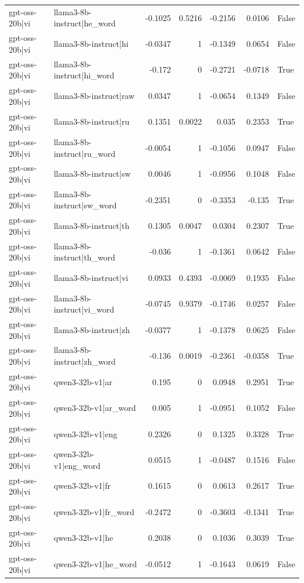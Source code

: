 \begin{table}
\begin{tabular}{l l r r r r l}
gpt-oss-20b|vi & llama3-8b-instruct|he_word & -0.1025 & 0.5216 & -0.2156 & 0.0106 & False \\
gpt-oss-20b|vi & llama3-8b-instruct|hi & -0.0347 & 1 & -0.1349 & 0.0654 & False \\
gpt-oss-20b|vi & llama3-8b-instruct|hi_word & -0.172 & 0 & -0.2721 & -0.0718 & True \\
gpt-oss-20b|vi & llama3-8b-instruct|raw & 0.0347 & 1 & -0.0654 & 0.1349 & False \\
gpt-oss-20b|vi & llama3-8b-instruct|ru & 0.1351 & 0.0022 & 0.035 & 0.2353 & True \\
gpt-oss-20b|vi & llama3-8b-instruct|ru_word & -0.0054 & 1 & -0.1056 & 0.0947 & False \\
gpt-oss-20b|vi & llama3-8b-instruct|sw & 0.0046 & 1 & -0.0956 & 0.1048 & False \\
gpt-oss-20b|vi & llama3-8b-instruct|sw_word & -0.2351 & 0 & -0.3353 & -0.135 & True \\
gpt-oss-20b|vi & llama3-8b-instruct|th & 0.1305 & 0.0047 & 0.0304 & 0.2307 & True \\
gpt-oss-20b|vi & llama3-8b-instruct|th_word & -0.036 & 1 & -0.1361 & 0.0642 & False \\
gpt-oss-20b|vi & llama3-8b-instruct|vi & 0.0933 & 0.4393 & -0.0069 & 0.1935 & False \\
gpt-oss-20b|vi & llama3-8b-instruct|vi_word & -0.0745 & 0.9379 & -0.1746 & 0.0257 & False \\
gpt-oss-20b|vi & llama3-8b-instruct|zh & -0.0377 & 1 & -0.1378 & 0.0625 & False \\
gpt-oss-20b|vi & llama3-8b-instruct|zh_word & -0.136 & 0.0019 & -0.2361 & -0.0358 & True \\
gpt-oss-20b|vi & qwen3-32b-v1|ar & 0.195 & 0 & 0.0948 & 0.2951 & True \\
gpt-oss-20b|vi & qwen3-32b-v1|ar_word & 0.005 & 1 & -0.0951 & 0.1052 & False \\
gpt-oss-20b|vi & qwen3-32b-v1|eng & 0.2326 & 0 & 0.1325 & 0.3328 & True \\
gpt-oss-20b|vi & qwen3-32b-v1|eng_word & 0.0515 & 1 & -0.0487 & 0.1516 & False \\
gpt-oss-20b|vi & qwen3-32b-v1|fr & 0.1615 & 0 & 0.0613 & 0.2617 & True \\
gpt-oss-20b|vi & qwen3-32b-v1|fr_word & -0.2472 & 0 & -0.3603 & -0.1341 & True \\
gpt-oss-20b|vi & qwen3-32b-v1|he & 0.2038 & 0 & 0.1036 & 0.3039 & True \\
gpt-oss-20b|vi & qwen3-32b-v1|he_word & -0.0512 & 1 & -0.1643 & 0.0619 & False \\

\end{tabular}
\end{table}
